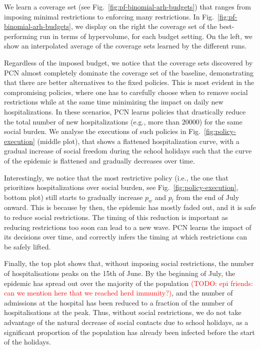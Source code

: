 \documentclass{article}
\newcommand\todo[1]{\textcolor{red}{(TODO: #1)}}
\begin{document}
We learn a coverage set (see Fig.~\ref{fig:pf-binomial-arh-budgets}) that ranges from imposing minimal restrictions to enforcing many restrictions. In Fig.~\ref{fig:pf-binomial-arh-budgets}, we display on the right the coverage set of the best-performing run in terms of hypervolume, for each budget setting. On the left, we show an interpolated average of the coverage sets learned by the different runs.

Regardless of the imposed budget, we notice that the coverage sets discovered by PCN almost completely dominate the coverage set of the baseline, demonstrating that there are better alternatives to the fixed policies. This is most evident in the compromising policies, where one has to carefully choose when to remove social restrictions while at the same time minimizing the impact on daily new hospitalizations. In these scenarios, PCN learns policies that drastically reduce the total number of new hospitalizations (e.g., more than $20000$) for the same social burden. We analyse the executions of such policies in Fig.~\ref{fig:policy-execution} (middle plot), that shows a flattened hospitalization curve, with a gradual increase of social freedom during the school holidays such that the curve of the epidemic is flattened and gradually decreases over time.

Interestingly, we notice that the most restrictive policy (i.e., the one that prioritizes hospitalizations over social burden, see Fig.~\ref{fig:policy-execution}, bottom plot) still starts to gradually increase $p_w$ and $p_l$ from the end of July onward. This is because by then, the epidemic has mostly faded out, and it is safe to reduce social restrictions. The timing of this reduction is important as reducing restrictions too soon can lead to a new wave. PCN learns the impact of its decisions over time, and correctly infers the timing at which restrictions can be safely lifted.

Finally, the top plot shows that, without imposing social restrictions, the number of hospitalisations peaks on the 15th of June. By the beginning of July, the epidemic has spread out over the majority of the population \todo{epi friends: can we mention here that we reached herd immunity?}, and the number of admissions at the hospital has been reduced to a fraction of the number of hospitalisations at the peak. Thus, without social restrictions, we do not take advantage of the natural decrease of social contacts due to school holidays, as a significant proportion of the population has already been infected before the start of the holidays.
\end{document}
